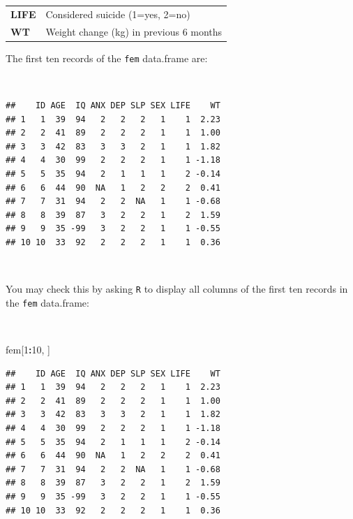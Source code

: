 \documentclass[12pt,a4paper]{book}
\newenvironment{Shaded}{\begin{snugshade}}{\end{snugshade}}
\newcommand{\DecValTok}[1]{\textcolor[rgb]{0.00,0.00,0.81}{#1}}
\newcommand{\OperatorTok}[1]{\textcolor[rgb]{0.81,0.36,0.00}{\textbf{#1}}}
\newcommand{\NormalTok}[1]{#1}
\theoremstyle{definition}
\theoremstyle{definition}
\theoremstyle{definition}
\theoremstyle{remark}
\begin{document}
\begin{longtable}[]{@{}ll@{}}
\begin{minipage}[t]{0.14\columnwidth}\raggedright
\textbf{LIFE}\strut
\end{minipage} & \begin{minipage}[t]{0.69\columnwidth}\raggedright
Considered suicide (1=yes, 2=no)\strut
\end{minipage}\tabularnewline
\begin{minipage}[t]{0.14\columnwidth}\raggedright
\textbf{WT}\strut
\end{minipage} & \begin{minipage}[t]{0.69\columnwidth}\raggedright
Weight change (kg) in previous 6 months\strut
\end{minipage}\tabularnewline
\bottomrule
\end{longtable}

\newpage

The first ten records of the \texttt{fem} data.frame are:

~

\begin{verbatim}
##    ID AGE  IQ ANX DEP SLP SEX LIFE    WT
## 1   1  39  94   2   2   2   1    1  2.23
## 2   2  41  89   2   2   2   1    1  1.00
## 3   3  42  83   3   3   2   1    1  1.82
## 4   4  30  99   2   2   2   1    1 -1.18
## 5   5  35  94   2   1   1   1    2 -0.14
## 6   6  44  90  NA   1   2   2    2  0.41
## 7   7  31  94   2   2  NA   1    1 -0.68
## 8   8  39  87   3   2   2   1    2  1.59
## 9   9  35 -99   3   2   2   1    1 -0.55
## 10 10  33  92   2   2   2   1    1  0.36
\end{verbatim}

~

You may check this by asking \texttt{R} to display all columns of the
first ten records in the \texttt{fem} data.frame:

~

\begin{Shaded}
\begin{Highlighting}[]
\NormalTok{fem[}\DecValTok{1}\OperatorTok{:}\DecValTok{10}\NormalTok{, ]}
\end{Highlighting}
\end{Shaded}

\begin{verbatim}
##    ID AGE  IQ ANX DEP SLP SEX LIFE    WT
## 1   1  39  94   2   2   2   1    1  2.23
## 2   2  41  89   2   2   2   1    1  1.00
## 3   3  42  83   3   3   2   1    1  1.82
## 4   4  30  99   2   2   2   1    1 -1.18
## 5   5  35  94   2   1   1   1    2 -0.14
## 6   6  44  90  NA   1   2   2    2  0.41
## 7   7  31  94   2   2  NA   1    1 -0.68
## 8   8  39  87   3   2   2   1    2  1.59
## 9   9  35 -99   3   2   2   1    1 -0.55
## 10 10  33  92   2   2   2   1    1  0.36
\end{verbatim}
\end{document}
